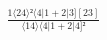 \documentclass[varwidth, border=5pt]{standalone}
\begin{document}
\begin{my}
$\begin{gathered}
\scriptscriptstyle\frac{1⟨24⟩²⟨4|1+2|3][23]}{⟨14⟩⟨4|1+2|4]²}
\end{gathered}$
\end{my}
\end{document}
